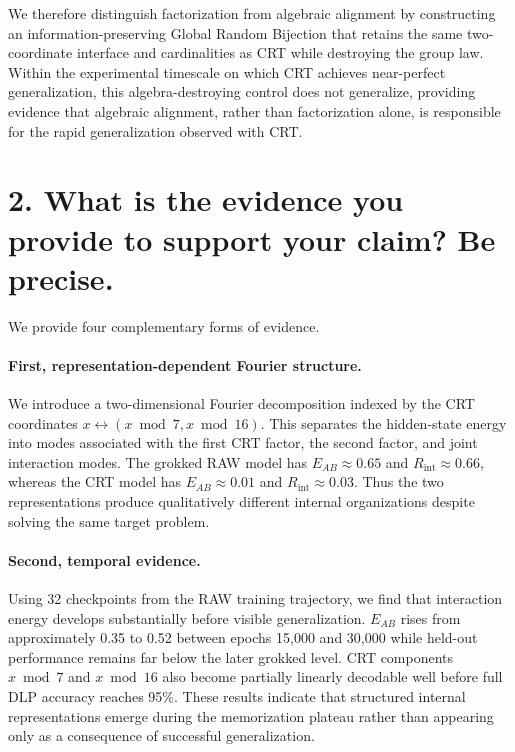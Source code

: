 \documentclass[9pt,a4paper]{extarticle}
\newcommand{\EAB}{E_{AB}}
\newcommand{\Rint}{R_{\mathrm{int}}}
\begin{document}
We therefore distinguish factorization from algebraic alignment by constructing an information-preserving Global Random Bijection that retains the same two-coordinate interface and cardinalities as CRT while destroying the group law. Within the experimental timescale on which CRT achieves near-perfect generalization, this algebra-destroying control does not generalize, providing evidence that algebraic alignment, rather than factorization alone, is responsible for the rapid generalization observed with CRT.

\section*{2. What is the evidence you provide to support your claim? Be precise.}

We provide four complementary forms of evidence.

\paragraph{First, representation-dependent Fourier structure.} We introduce a two-dimensional Fourier decomposition indexed by the CRT coordinates $x \leftrightarrow (x \bmod 7, x \bmod 16)$. This separates the hidden-state energy into modes associated with the first CRT factor, the second factor, and joint interaction modes. The grokked RAW model has $\EAB \approx 0.65$ and $\Rint \approx 0.66$, whereas the CRT model has $\EAB \approx 0.01$ and $\Rint \approx 0.03$. Thus the two representations produce qualitatively different internal organizations despite solving the same target problem.

\paragraph{Second, temporal evidence.} Using 32 checkpoints from the RAW training trajectory, we find that interaction energy develops substantially before visible generalization. $\EAB$ rises from approximately 0.35 to 0.52 between epochs 15,000 and 30,000 while held-out performance remains far below the later grokked level. CRT components $x \bmod 7$ and $x \bmod 16$ also become partially linearly decodable well before full DLP accuracy reaches 95\%. These results indicate that structured internal representations emerge during the memorization plateau rather than appearing only as a consequence of successful generalization.
\end{document}
